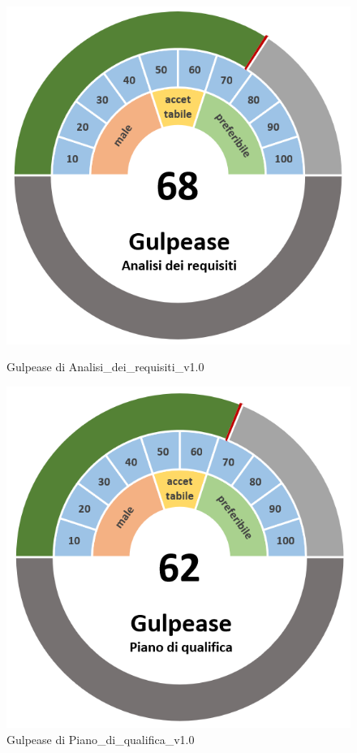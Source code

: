 \begin{figure}[H]
    \centering
    \begin{minipage}[b]{0.45\textwidth}
        \centering
        \includegraphics[width=\textwidth]{GulpeaseAdr.png}
        \caption{Gulpease di Analisi\_dei\_requisiti\_v1.0}
    \end{minipage}
    \hfill
    \begin{minipage}[b]{0.45\textwidth}
        \centering
        \includegraphics[width=\textwidth]{GulpeasePdq.png}
        \caption{Gulpease di Piano\_di\_qualifica\_v1.0}
    \end{minipage}
\end{figure}
